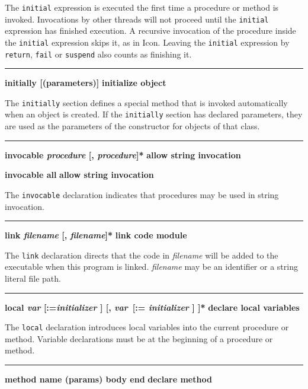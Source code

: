 \noindent
{}The \texttt{initial} expression is executed the first
time a procedure or method is invoked.
Invocations by other threads \ConcurrencyIssue
will not proceed until the \texttt{initial} expression has finished execution.
A recursive invocation of the procedure inside the \texttt{initial} expression
skips it, as in Icon. Leaving the \texttt{initial} expression by \texttt{return},
\texttt{fail} or \texttt{suspend} also counts as finishing it.

\bigskip\hrule\vspace{0.1cm}
\noindent
{\bf \textbf{initially} [(parameters)] } \hfill {\bf initialize object}

\noindent
{}The \texttt{initially} section defines a special method
that is invoked automatically when an object is created. If the
\texttt{initially} section has declared parameters, they are used as
the parameters of the constructor for objects
of that class.

\bigskip\hrule\vspace{0.1cm}
\noindent
{\bf \textbf{invocable} \textit{procedure} [, \textit{procedure}]* } \hfill {\bf allow string invocation}

\noindent
{}
{\textbf{invocable all} } \hfill {\bf allow string invocation}

\noindent
The \texttt{invocable} declaration indicates that procedures may be used
in string invocation.

\bigskip\hrule\vspace{0.1cm}
\noindent
{\bf \textbf{link} \textit{filename} [, \textit{filename}]* } \hfill {\bf link code module}

\noindent
The \texttt{link} declaration directs that the code in
\textit{filename} will be added to the executable when this program is
linked. \textit{filename} may be an identifier or a string literal file
path.

\bigskip\hrule\vspace{0.1cm}
\noindent
{\bf \textbf{local} \textit{var} [:=\textit{initializer} ] [, \textit{var}\ [:=\textit{ initializer} ] ]* } \hfill {\bf declare local variables}

\noindent
{}The \texttt{local} declaration introduces local
variables into the current procedure or method.
Variable declarations must be at the beginning of a
procedure or method.

\bigskip\hrule\vspace{0.1cm}
\noindent
{\bf method name (params) body end } \hfill {\bf declare method}

